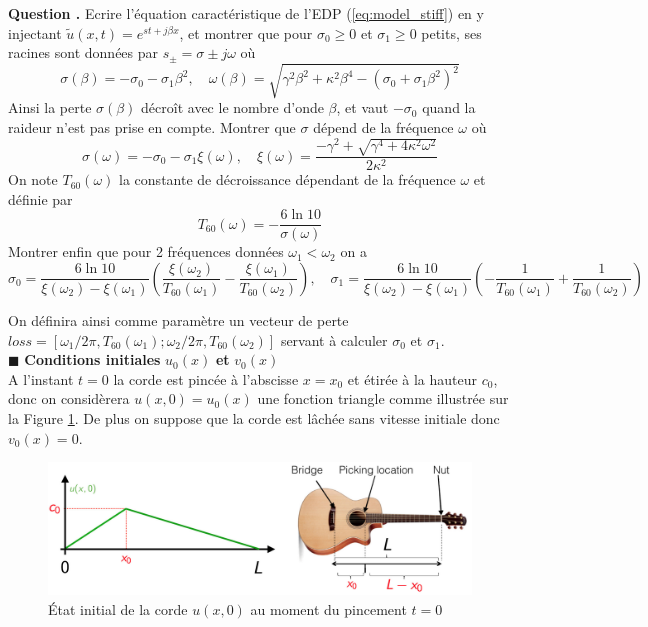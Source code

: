 \documentclass[a4,12pt]{article}
\newcounter{Nbquestion}
\newcommand*\question{%
\stepcounter{Nbquestion}%
\textbf{Question \theNbquestion. }}
\begin{document}
\begin{mdframed}[style=exampledefault]
\question Ecrire l'équation caractéristique de l'EDP (\ref{eq:model_stiff}) en y injectant $\tilde u(x,t)=e^{st+j\beta x}$, et montrer que pour $\sigma_0\geqslant 0$ et $\sigma_1\geqslant 0$ petits, ses racines sont données par $s_{\pm}=\sigma\pm j\omega$ où 
\[
\sigma(\beta)=-\sigma_0-\sigma_1\beta^2,\quad \omega(\beta)=\sqrt{\gamma^2 \beta^2+\kappa^2\beta^4-(\sigma_0+\sigma_1\beta^2)^2}
\]
Ainsi la perte $\sigma(\beta)$ décroît avec le nombre d'onde $\beta$, et vaut $-\sigma_0$ quand la raideur n'est pas prise en compte.  Montrer que $\sigma$ dépend de la fréquence $\omega$ où 
\[
\sigma(\omega)=-\sigma_0-\sigma_1\xi (\omega),\quad \xi(\omega)=\frac{-\gamma^2+\sqrt{\gamma^4+4\kappa^2 \omega^2}}{2\kappa^2}
\]
On note $T_{60}(\omega)$ la constante de décroissance dépendant de la fréquence $\omega$ et définie par 
\[
T_{60}(\omega)=-\frac{6\ln 10}{\sigma(\omega)}
\]
Montrer enfin que pour 2 fréquences données $\omega_1<\omega_2$ on a 
\[
\sigma_0=\frac{6 \ln 10}{\xi(\omega_2)-\xi(\omega_1)}\left(\frac{\xi(\omega_2)}{T_{60}(\omega_1)}-\frac{\xi(\omega_1)}{T_{60}(\omega_2)}\right), \quad \sigma_1=\frac{6 \ln 10}{\xi(\omega_2)-\xi(\omega_1)}\left(-\frac{1}{T_{60}(\omega_1)}+\frac{1}{T_{60}(\omega_2)}\right)
\]
\end{mdframed}


On définira ainsi comme paramètre un vecteur de perte $loss=[\omega_1/2\pi,T_{60}(\omega_1) ; \omega_2/2\pi,T_{60}(\omega_2)]$ servant à calculer $\sigma_0$ et $\sigma_1$. \\

\hspace{0.5cm} $\blacksquare$ \textbf{Conditions initiales} $u_0(x)$ \textbf{et} $v_0(x)$\\

A l'instant $t=0$ la corde est pincée à l'abscisse $x=x_0$ et étirée à la hauteur $c_0$, donc on considèrera $u(x,0)=u_0(x)$ une fonction triangle comme illustrée sur la Figure \ref{fig:triangle}. De plus on suppose que la corde est lâchée sans vitesse initiale donc $v_0(x)=0$.\\

\begin{figure}
	\begin{center}
		\includegraphics[width=\textwidth]{images/triangle.pdf}
		\caption{\'Etat initial de la corde $u(x,0)$ au moment du pincement $t=0$}
		\label{fig:triangle}
	\end{center}
\end{figure}
\end{document}
